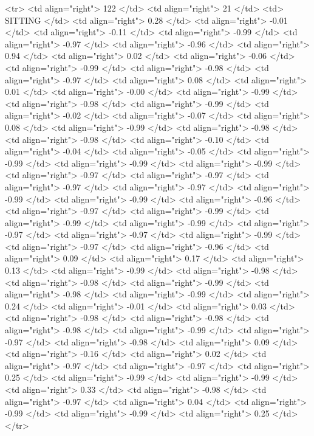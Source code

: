   <tr> <td align="right"> 122 </td> <td align="right">  21 </td> <td> SITTING </td> <td align="right"> 0.28 </td> <td align="right"> -0.01 </td> <td align="right"> -0.11 </td> <td align="right"> -0.99 </td> <td align="right"> -0.97 </td> <td align="right"> -0.96 </td> <td align="right"> 0.94 </td> <td align="right"> 0.02 </td> <td align="right"> -0.06 </td> <td align="right"> -0.99 </td> <td align="right"> -0.98 </td> <td align="right"> -0.97 </td> <td align="right"> 0.08 </td> <td align="right"> 0.01 </td> <td align="right"> -0.00 </td> <td align="right"> -0.99 </td> <td align="right"> -0.98 </td> <td align="right"> -0.99 </td> <td align="right"> -0.02 </td> <td align="right"> -0.07 </td> <td align="right"> 0.08 </td> <td align="right"> -0.99 </td> <td align="right"> -0.98 </td> <td align="right"> -0.98 </td> <td align="right"> -0.10 </td> <td align="right"> -0.04 </td> <td align="right"> -0.05 </td> <td align="right"> -0.99 </td> <td align="right"> -0.99 </td> <td align="right"> -0.99 </td> <td align="right"> -0.97 </td> <td align="right"> -0.97 </td> <td align="right"> -0.97 </td> <td align="right"> -0.97 </td> <td align="right"> -0.99 </td> <td align="right"> -0.99 </td> <td align="right"> -0.96 </td> <td align="right"> -0.97 </td> <td align="right"> -0.99 </td> <td align="right"> -0.99 </td> <td align="right"> -0.99 </td> <td align="right"> -0.97 </td> <td align="right"> -0.97 </td> <td align="right"> -0.99 </td> <td align="right"> -0.97 </td> <td align="right"> -0.96 </td> <td align="right"> 0.09 </td> <td align="right"> 0.17 </td> <td align="right"> 0.13 </td> <td align="right"> -0.99 </td> <td align="right"> -0.98 </td> <td align="right"> -0.98 </td> <td align="right"> -0.99 </td> <td align="right"> -0.98 </td> <td align="right"> -0.99 </td> <td align="right"> 0.24 </td> <td align="right"> -0.01 </td> <td align="right"> 0.03 </td> <td align="right"> -0.98 </td> <td align="right"> -0.98 </td> <td align="right"> -0.98 </td> <td align="right"> -0.99 </td> <td align="right"> -0.97 </td> <td align="right"> -0.98 </td> <td align="right"> 0.09 </td> <td align="right"> -0.16 </td> <td align="right"> 0.02 </td> <td align="right"> -0.97 </td> <td align="right"> -0.97 </td> <td align="right"> 0.25 </td> <td align="right"> -0.99 </td> <td align="right"> -0.99 </td> <td align="right"> 0.33 </td> <td align="right"> -0.98 </td> <td align="right"> -0.97 </td> <td align="right"> 0.04 </td> <td align="right"> -0.99 </td> <td align="right"> -0.99 </td> <td align="right"> 0.25 </td> </tr>
